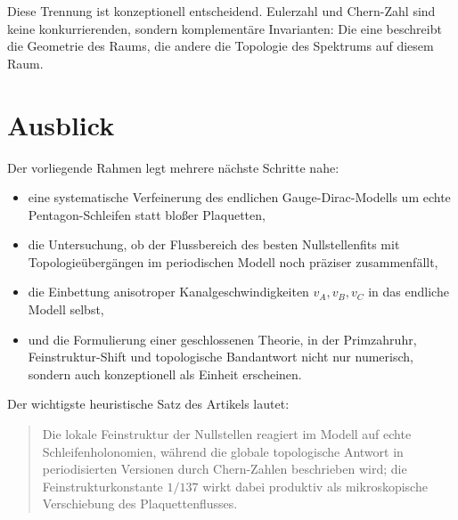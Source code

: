 \documentclass[11pt,a4paper]{article}
\theoremstyle{remark}
\begin{document}
	Diese Trennung ist konzeptionell entscheidend. Eulerzahl und Chern-Zahl sind keine konkurrierenden, sondern komplementäre Invarianten: Die eine beschreibt die Geometrie des Raums, die andere die Topologie des Spektrums auf diesem Raum.
	
	\section{Ausblick}
	
	Der vorliegende Rahmen legt mehrere nächste Schritte nahe:
	\begin{itemize}
		\item eine systematische Verfeinerung des endlichen Gauge-Dirac-Modells um echte Pentagon-Schleifen statt bloßer Plaquetten,
		\item die Untersuchung, ob der Flussbereich des besten Nullstellenfits mit Topologieübergängen im periodischen Modell noch präziser zusammenfällt,
		\item die Einbettung anisotroper Kanalgeschwindigkeiten $v_A,v_B,v_C$ in das endliche Modell selbst,
		\item und die Formulierung einer geschlossenen Theorie, in der Primzahruhr, Feinstruktur-Shift und topologische Bandantwort nicht nur numerisch, sondern auch konzeptionell als Einheit erscheinen.
	\end{itemize}
	
	Der wichtigste heuristische Satz des Artikels lautet:
	\begin{quote}
		Die lokale Feinstruktur der Nullstellen reagiert im Modell auf echte Schleifenholonomien, während die globale topologische Antwort in periodisierten Versionen durch Chern-Zahlen beschrieben wird; die Feinstrukturkonstante $1/137$ wirkt dabei produktiv als mikroskopische Verschiebung des Plaquettenflusses.
	\end{quote}
	
\end{document}
